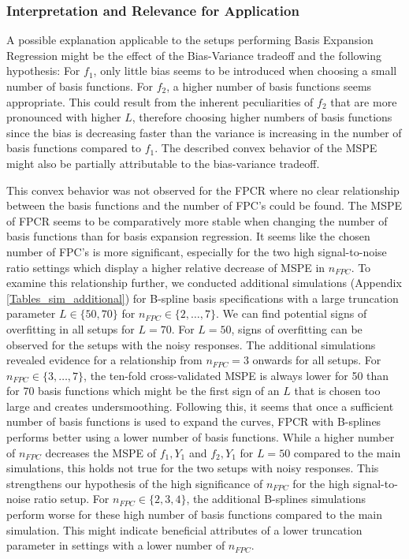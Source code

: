 \documentclass[11pt,twoside,a4paper]{article}
\begin{document}
	\subsubsection{Interpretation and Relevance for Application}
	A possible explanation applicable to the setups performing Basis Expansion Regression might be the effect of the Bias-Variance tradeoff and the following hypothesis: For $f_1$, only little bias seems to be introduced when choosing a small number of basis functions. For $f_2$, a higher number of basis functions seems appropriate. This could result from the inherent peculiarities of $f_2$ that are more pronounced with higher $L$, therefore choosing higher numbers of basis functions since the bias is decreasing faster than the variance is increasing in the number of basis functions compared to $f_1$. The described convex behavior of the MSPE might also be partially attributable to the bias-variance tradeoff.  
	
	This convex behavior was not observed for the FPCR where no clear relationship between the basis functions and the number of FPC's could be found. The MSPE of FPCR seems to be comparatively more stable when changing the number of basis functions than for basis expansion regression. It seems like the chosen number of FPC's is more significant, especially for the two high signal-to-noise ratio settings which display a higher relative decrease of MSPE in $n_{FPC}$. To examine this relationship further, we conducted additional simulations (Appendix \ref{Tables_sim_additional}) for B-spline basis specifications with a large truncation parameter $L \in \{50, 70\}$ for $n_{FPC} \in \{2, \dots, 7 \}$. We can find potential signs of overfitting in all setups for $L = 70$. For $L = 50$, signs of overfitting can be observed for the setups with the noisy responses. The additional simulations revealed evidence for a relationship from $n_{FPC} = 3$ onwards for all setups. For $n_{FPC} \in \{3, \dots, 7 \}$, the ten-fold cross-validated MSPE is always lower for 50 than for 70 basis functions which might be the first sign of an $L$ that is chosen too large and creates undersmoothing. Following this, it seems that once a sufficient number of basis functions is used to expand the curves, FPCR with B-splines performs better using a lower number of basis functions. While a higher number of $n_{FPC}$ decreases the MSPE of $f_1,Y_1$ and $f_2,Y_1$ for $L = 50$ compared to the main simulations, this holds not true for the two setups with noisy responses. This strengthens our hypothesis of the high significance of $n_{FPC}$ for the high signal-to-noise ratio setup. For $n_{FPC} \in \{2, 3, 4 \}$, the additional B-splines simulations perform worse for these high number of basis functions compared to the main simulation.  This might indicate beneficial attributes of a lower truncation parameter in settings with a lower number of $n_{FPC}$.
	
\end{document}
